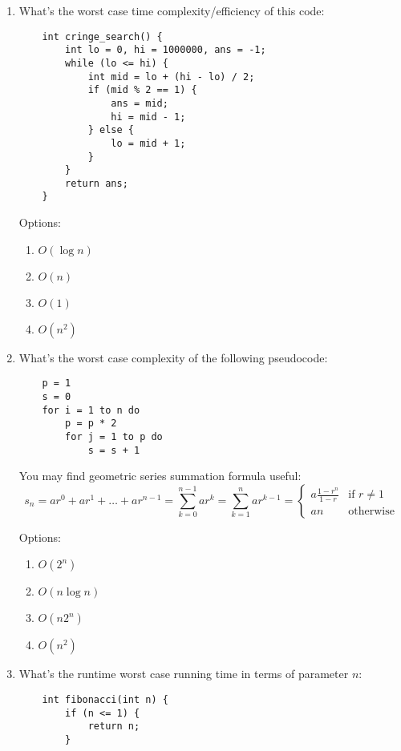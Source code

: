 \documentclass{article}
\begin{document}
\begin{enumerate}
    \item What’s the worst case time complexity/efficiency of this code:
    \begin{lstlisting}
    int cringe_search() {
        int lo = 0, hi = 1000000, ans = -1;
        while (lo <= hi) {
            int mid = lo + (hi - lo) / 2;
            if (mid % 2 == 1) {
                ans = mid;
                hi = mid - 1;
            } else {
                lo = mid + 1;
            }
        }
        return ans;
    }
    \end{lstlisting}
    Options:
    \begin{enumerate}[label=\alph*.]
        \item \( O(\log n) \)
        \item \( O(n) \)
        \item \( O(1) \)
        \item \( O(n^2) \)
    \end{enumerate}
    
    \item What’s the worst case complexity of the following pseudocode:
    \begin{lstlisting}
    p = 1
    s = 0
    for i = 1 to n do
        p = p * 2
        for j = 1 to p do
            s = s + 1
    \end{lstlisting}

    You may find geometric series summation formula useful:
    \[
    s_n = a r^0 + ar^1 + \ldots + ar^{n-1} = \sum_{k=0}^{n-1} ar^k = \sum_{k=1}^{n} ar^{k-1} = 
    \begin{cases} 
    a \frac{1-r^n}{1-r} & \text{if } r \neq 1 \\
    an & \text{otherwise}
    \end{cases}
    \]
    
    Options:
    \begin{enumerate}[label=\alph*.]
        \item \( O(2^n) \)
        \item \( O(n \log n) \)
        \item \( O(n 2^n) \)
        \item \( O(n^2) \)
    \end{enumerate}
    \newpage
    
    \item What's the runtime worst case running time in terms of parameter \( n \):
    \begin{lstlisting}
    int fibonacci(int n) {
        if (n <= 1) {
            return n;
        }
    

\end{lstlisting}
\end{enumerate}
\end{document}
